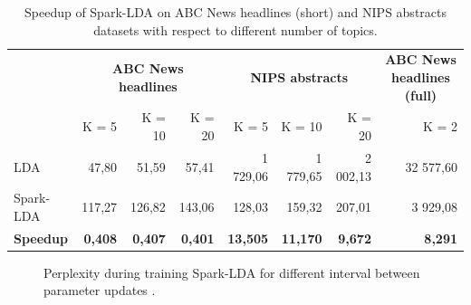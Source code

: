\documentclass[journal]{IEEEtran}
\begin{document}
\begin{table}[t]
\centering
\caption{Speedup of Spark-LDA on ABC News headlines (short) and NIPS abstracts datasets with respect to different number of topics.}
\begin{tabular}{lrrrrrrr} \toprule
                 & \multicolumn{3}{c}{\textbf{ABC News headlines}} & \multicolumn{3}{c}{\textbf{NIPS abstracts}}        & \multicolumn{1}{c}{\textbf{ABC News headlines (full)}} \\
                 & K = 5             & K = 10           & K = 20           & K = 5           & K = 10          & K = 20         & K = 2                                           \\ \midrule
LDA              & 47,80             & 51,59            & 57,41            & 1 729,06        & 1 779,65        & 2 002,13       & 32 577,60                                       \\
Spark-LDA        & 117,27            & 126,82           & 143,06           & 128,03          & 159,32          & 207,01         & 3 929,08                                        \\ \midrule
\textbf{Speedup} & \textbf{0,408}    & \textbf{0,407}   & \textbf{0,401}   & \textbf{13,505} & \textbf{11,170} & \textbf{9,672} & \textbf{8,291}  \\ \bottomrule                         
\end{tabular}
\label{tab:speedup}
\end{table}

\begin{figure}[t]
\centering
{}
\hfil
{}
\caption{Perplexity during training Spark-LDA for different interval between parameter updates .}
\label{fig_sim}
\end{figure}
\end{document}
